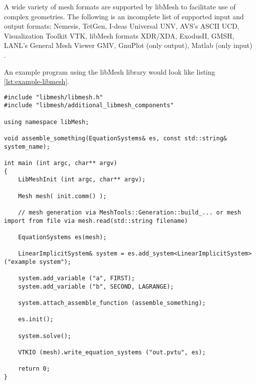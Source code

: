 A wide variety of mesh formats are supported by libMesh to facilitate use of complex geometries. The following is an incomplete list of supported input and output formats: Nemesis, TetGen, I-deas Universal UNV, AVS's ASCII UCD, Visualization Toolkit VTK, libMesh formats XDR/XDA, ExodusII, GMSH, LANL's General Mesh Viewer GMV, GnuPlot (only output), Matlab (only input) \cite{kirk2013case}.
 
 An example program using the libMesh library would look like listing \ref{lst:example-libmesh}.
 \begin{lstlisting}[caption=Example libMesh program,label=lst:example-libmesh]
#include "libmesh/libmesh.h"
#include "libmesh/additional_libmesh_components"

using namespace libMesh;

void assemble_something(EquationSystems& es, const std::string& system_name);

int main (int argc, char** argv)
{
	LibMeshInit (int argc, char** argv);
	
	Mesh mesh( init.comm() );
	
	// mesh generation via MeshTools::Generation::build_... or mesh import from file via mesh.read(std::string filename)
	
	EquationSystems es(mesh);
	
	LinearImplicitSystem& system = es.add_system<LinearImplicitSystem> ("example system");
	
	system.add_variable ("a", FIRST);
	system.add_variable ("b", SECOND, LAGRANGE);
	
	system.attach_assemble_function (assemble_something);

	es.init();
	
	system.solve();
	
	VTKIO (mesh).write_equation_systems ("out.pvtu", es);
	
	return 0;
}
 \end{lstlisting}
